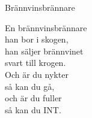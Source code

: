 \begin{song}{Brännvinsbrännare}
	

	
	En brännvinsbrännare\\
	han bor i skogen,\\
	han säljer brännvinet\\
	svart till krogen.\\
	Och är du nykter\\
	så kan du gå,\\
	och är du fuller\\
	så kan du INT.
	
\end{song}
